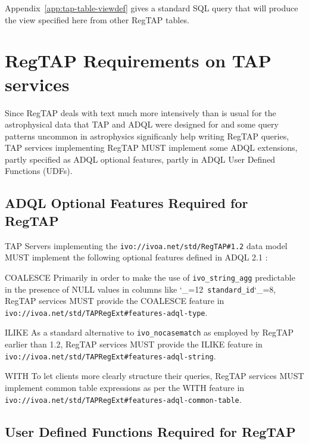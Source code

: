 \documentclass[11pt,a4paper]{ivoa}
\makeatletter
\def\rtent#1{\texttt{\color{rtcolor}\verb|#1|}}
\def\makeunderscoreletter{\catcode`\_=12}
\def\makeunderscoresubscript{\catcode`\_=8}
\def\rtent{\makeunderscoreletter\relax\rt@nt}
\def\rt@nt#1{\texttt{\color{rtcolor} #1}\makeunderscoresubscript{}}
\makeatother
\begin{document}
Appendix~\ref{app:tap-table-viewdef} gives a standard SQL query that
will produce the view specified here from other RegTAP tables.


\section{RegTAP Requirements on TAP services}

Since RegTAP deals with text much more intensively than is usual for the
astrophysical data that TAP and ADQL were designed for and some query
patterns uncommon in astrophysics significanly help writing RegTAP
queries, TAP services implementing RegTAP MUST implement some ADQL
extensions, partly specified as ADQL optional features, partly in ADQL
User Defined Functions (UDFs).


\subsection{ADQL Optional Features Required for RegTAP}

TAP Servers implementing the
\texttt{ivo://ivoa.net/std/RegTAP\#1.2} data model MUST implement the
following optional features defined in ADQL 2.1 \citep{2023ivoa.spec.1215M}:

\begin{bigdescription}
\item[COALESCE] Primarily in order to make the use of
\verb|ivo_string_agg| predictable in the presence of NULL values in
columns like \rtent{standard_id}, RegTAP services MUST provide the
COALESCE feature in
\nolinkurl{ivo://ivoa.net/std/TAPRegExt#features-adql-type}.

\item[ILIKE] As a standard alternative to \verb|ivo_nocasematch| as
employed by RegTAP earlier than 1.2, RegTAP services MUST provide the
ILIKE feature in
\nolinkurl{ivo://ivoa.net/std/TAPRegExt#features-adql-string}.

\item[WITH] To let clients more clearly structure their queries, RegTAP
services MUST implement common table expressions as per the WITH feature
in \nolinkurl{ivo://ivoa.net/std/TAPRegExt#features-adql-common-table}.
\end{bigdescription}


\subsection{User Defined Functions Required for RegTAP}
\label{adqludf}
\end{document}
